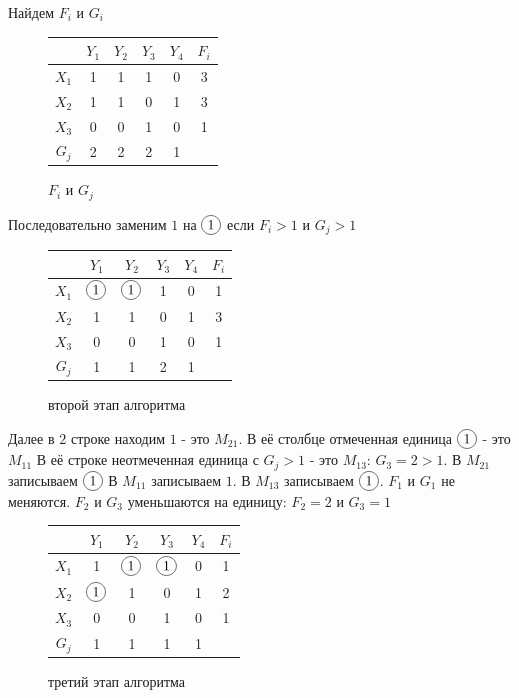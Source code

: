 \documentclass[12pt]{article}
\newcommand*\circled[1]{\tikz[baseline=(char.base)]{
            \node[shape=circle,draw,inner sep=2pt] (char) {#1};}}
\begin{document}
Найдем $F_i$ и $G_i$

\begin{figure}[H]
    \centering
    \begin{tabular}{ c|c|c|c|c|c }
              & $Y_1$ & $Y_2$ & $Y_3$ & $Y_4$ & $F_i$ \\
        \hline
        $X_1$ & 1     & 1     & 1     & 0     & 3     \\
        \hline
        $X_2$ & 1     & 1     & 0     & 1     & 3     \\
        \hline
        $X_3$ & 0     & 0     & 1     & 0     & 1     \\
        \hline
        $G_j$ & 2     & 2     & 2     & 1     &
    \end{tabular}
    \label{fig:FiGj}
    \caption{$F_i$ и $G_j$}
\end{figure}

Последовательно заменим $1$ на $\circled{1}$ если $F_i > 1$ и $G_j > 1$

\begin{figure}[H]
    \centering
    \begin{tabular}{ c|c|c|c|c|c }
              & $Y_1$         & $Y_2$         & $Y_3$ & $Y_4$ & $F_i$ \\
        \hline
        $X_1$ & $\circled{1}$ & $\circled{1}$ & 1     & 0     & 1     \\
        \hline
        $X_2$ & 1             & 1             & 0     & 1     & 3     \\
        \hline
        $X_3$ & 0             & 0             & 1     & 0     & 1     \\
        \hline
        $G_j$ & 1             & 1             & 2     & 1     &
    \end{tabular}
    \label{fig:second_step_complete}
    \caption{второй этап алгоритма}
\end{figure}

Далее в $2$ строке находим $1$ - это $M_{21}$. В её
столбце отмеченная единица $\circled{1}$ - это $M_{11}$
В её строке неотмеченная единица с $G_j > 1$ - это $M_{13}$:
$G_3 = 2 > 1$. В $M_{21}$ записываем $\circled{1}$ В $M_{11}$
записываем $1$. В $M_{13}$ записываем $\circled{1}$.
$F_1$ и $G_1$ не меняются. $F_2$ и $G_3$ уменьшаются на единицу:
$F_2 = 2$ и $G_3 = 1$

\begin{figure}[H]
    \centering
    \begin{tabular}{ c|c|c|c|c|c }
              & $Y_1$         & $Y_2$         & $Y_3$         & $Y_4$ & $F_i$ \\
        \hline
        $X_1$ & 1             & $\circled{1}$ & $\circled{1}$ & 0     & 1     \\
        \hline
        $X_2$ & $\circled{1}$ & 1             & 0             & 1     & 2     \\
        \hline
        $X_3$ & 0             & 0             & 1             & 0     & 1     \\
        \hline
        $G_j$ & 1             & 1             & 1             & 1     &
    \end{tabular}
    \label{fig:third_step_complete}
    \caption{третий этап алгоритма}
\end{figure}
\end{document}
